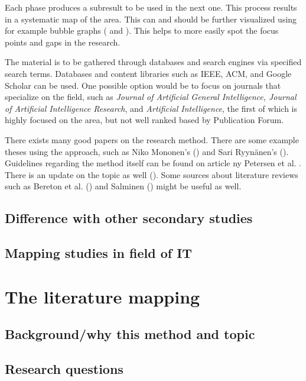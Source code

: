 \documentclass[utf8,english]{gradu3}
\begin{document}
Each phase produces a subresult to be used in the next one. This process results in a systematic map of the area. This can and should be further visualized using for example bubble graphs (\cite{mononen2018} and \cite{petersen2008}). This helps to more easily spot the focus points and gaps in the research.


The material is to be gathered through databases and search engines via specified search terms. Databases and content libraries such as IEEE, ACM, and Google Scholar can be used. One possible option would be to focus on journals that specialize on the field, such as \textit{Journal of Artificial General Intelligence, Journal of Artificial Intelligence Research}, and \textit{Artificial Intelligence}, the first of which is highly focused on the area, but not well ranked based by Publication Forum. 

There exists many good papers on the research method. There are some example theses using the approach, such as Niko Mononen's (\cite{mononen2018}) and Sari Ryynänen's (\cite{ryynanen2017}). Guidelines regarding the method itself can be found on article ny Petersen et al. \cite*{petersen2008}. There is an update on the topic as well (\cite{petersen2015}). Some sources about literature reviews such as Bereton et al. (\cite*{brereton2007}) and Salminen (\cite*{salminen2011}) might be useful as well.

\section{Difference with other secondary studies}

\section{Mapping studies in field of IT}

\chapter{The literature mapping}

\section{Background/why this method and topic}

\section{Research questions}
\end{document}
